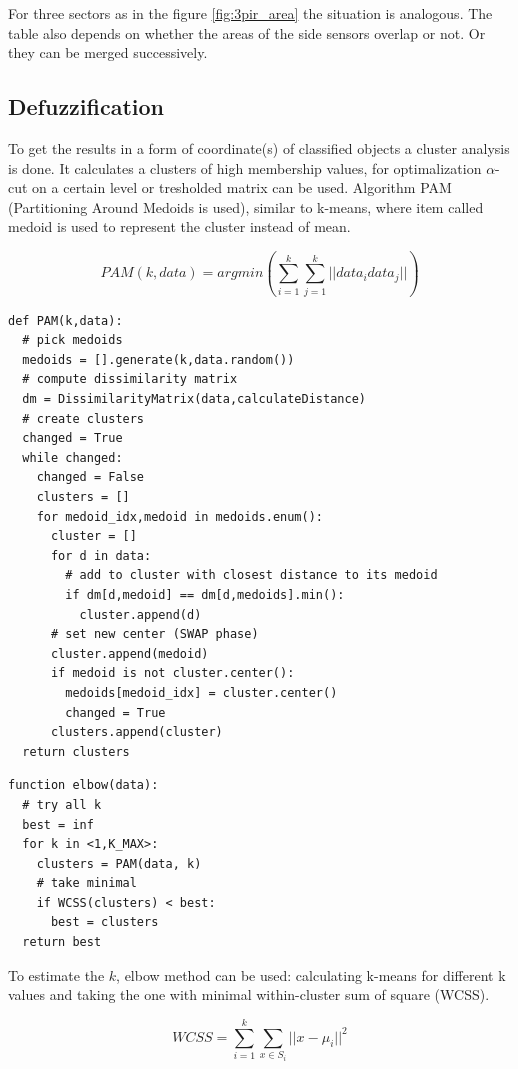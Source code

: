 For three sectors as in the figure \ref{fig:3pir_area} the situation is analogous. The table also depends
on whether the areas of the side sensors overlap or not. Or they can be merged successively.

\subsection*{Defuzzification}

To get the results in a form of coordinate(s) of classified objects a cluster analysis is done. It calculates
a clusters of high membership values, for optimalization $\alpha$-cut on a certain level or tresholded
matrix can be used. Algorithm PAM (Partitioning Around Medoids is used), similar to k-means, where item called
medoid is used to represent the cluster instead of mean.

$$ \mathit{PAM}(k, data) = argmin \left( \sum_{i=1}^{k} \sum_{j=1}^{k} ||data_{i} data_{j}||  \right) $$

\begin{lstlisting}[style=python]
def PAM(k,data):
  # pick medoids
  medoids = [].generate(k,data.random())
  # compute dissimilarity matrix
  dm = DissimilarityMatrix(data,calculateDistance)
  # create clusters
  changed = True
  while changed:
    changed = False
    clusters = []
    for medoid_idx,medoid in medoids.enum():
      cluster = []
      for d in data:
        # add to cluster with closest distance to its medoid
        if dm[d,medoid] == dm[d,medoids].min():
          cluster.append(d)
      # set new center (SWAP phase)
      cluster.append(medoid)
      if medoid is not cluster.center():
        medoids[medoid_idx] = cluster.center()
        changed = True
      clusters.append(cluster)
  return clusters
\end{lstlisting}

\begin{lstlisting}[style=python]
function elbow(data):
  # try all k
  best = inf
  for k in <1,K_MAX>:
    clusters = PAM(data, k)
    # take minimal
    if WCSS(clusters) < best:
      best = clusters
  return best
\end{lstlisting}

To estimate the $k$, elbow method can be used: calculating k-means for different k values and taking the one with
minimal within-cluster sum of square (WCSS).\cite{ClusterAnalysis} \cite{VagueNatureInformation}

$$\mathit{WCSS} = \sum_{i=1}^{k} \sum_{x \in S_i} ||x - \mu_i||^2$$

